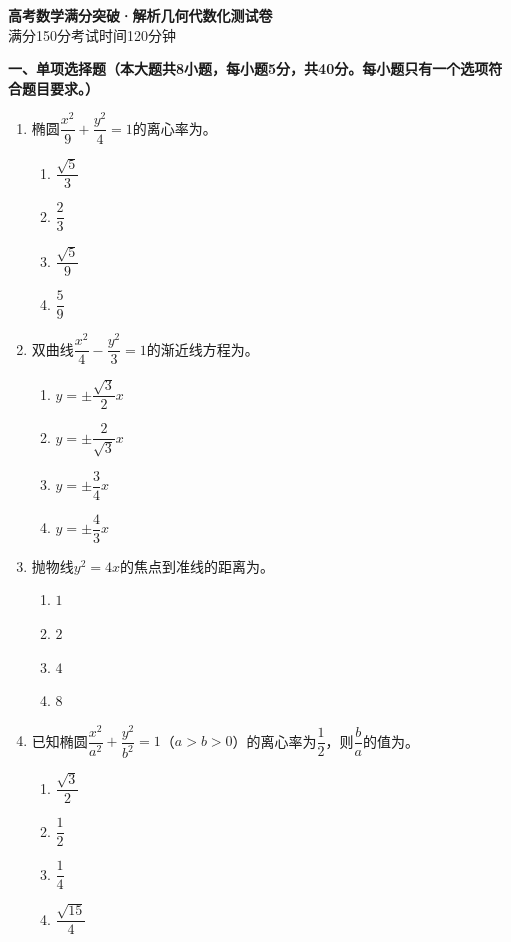 \documentclass[12pt, a4paper]{ctexart}
\newcommand{\blank}[1]{\underline{\hspace{#1}}}
\begin{document}
\begin{center}
{\LARGE\bfseries 高考数学满分突破·解析几何代数化\quad 测试卷}\\[0.5em]
{\large 满分150分\quad 考试时间120分钟}
\end{center}

\vspace{1em}

\noindent\textbf{一、单项选择题（本大题共8小题，每小题5分，共40分。每小题只有一个选项符合题目要求。）}

\begin{enumerate}
\item 椭圆$\dfrac{x^2}{9}+\dfrac{y^2}{4}=1$的离心率为\blank{3cm}。
\begin{enumerate}[label=\Alph*.]
\item $\dfrac{\sqrt{5}}{3}$
\item $\dfrac{2}{3}$
\item $\dfrac{\sqrt{5}}{9}$
\item $\dfrac{5}{9}$
\end{enumerate}

\item 双曲线$\dfrac{x^2}{4}-\dfrac{y^2}{3}=1$的渐近线方程为\blank{3cm}。
\begin{enumerate}[label=\Alph*.]
\item $y=\pm\dfrac{\sqrt{3}}{2}x$
\item $y=\pm\dfrac{2}{\sqrt{3}}x$
\item $y=\pm\dfrac{3}{4}x$
\item $y=\pm\dfrac{4}{3}x$
\end{enumerate}

\item 抛物线$y^2=4x$的焦点到准线的距离为\blank{3cm}。
\begin{enumerate}[label=\Alph*.]
\item $1$
\item $2$
\item $4$
\item $8$
\end{enumerate}

\item 已知椭圆$\dfrac{x^2}{a^2}+\dfrac{y^2}{b^2}=1$（$a>b>0$）的离心率为$\dfrac{1}{2}$，则$\dfrac{b}{a}$的值为\blank{3cm}。
\begin{enumerate}[label=\Alph*.]
\item $\dfrac{\sqrt{3}}{2}$
\item $\dfrac{1}{2}$
\item $\dfrac{1}{4}$
\item $\dfrac{\sqrt{15}}{4}$
\end{enumerate}


\end{enumerate}
\end{document}
